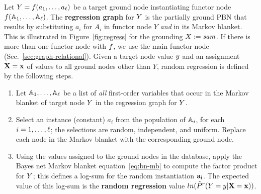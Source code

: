 \documentclass[twoside,leqno,twocolumn]{article}
\begin{document}
Let $Y = f(a_{1},\ldots,a_{\ell})$ be a target ground node instantiating functor node $f(\mathbb{A}_{1},\ldots,\mathbb{A}_{\ell})$.
The \textbf{regression graph} for $Y$ is the partially ground PBN %
that results by substituting $a_{i}$ for $A_{i}$ in functor node $Y$ {\em and} in its Markov blanket. This is illustrated in Figure~\ref{fig:regress} for the grounding $X:= \it{sam}$. If there is more than one functor node with $f$, we use the main functor node (Sec.~\ref{sec:graph-relational}). 
Given a target node value $y$ and an assignment $\mathbf{X} = \mathbf{x}$ of values to all ground nodes other than $Y$, random regression is defined by the following steps.

\begin{enumerate}
\item Let $\mathbb{A}_{1},\ldots,\mathbb{A}_{\ell}$ be a list of {\em all} first-order variables that occur in the Markov blanket of target node $Y$ in the regression graph for $Y$.
\item Select an instance (constant) $a_{i}$ from the population of $\mathbb{A}_{i}$, for each $i=1,\ldots,\ell$; the selections are random, independent, and uniform. Replace each node in the Markov blanket with the corresponding ground node.
\item Using the values assigned to the ground nodes in the database, apply the Bayes net Markov blanket equation~\eqref{eq:bn-mb} 
to compute the factor product for $Y$; this defines a log-sum for the random instantiation $\mathbf{a_{i}}$. The expected value of this log-sum is the \textbf{random regression} value $ln(\tilde{P}^{r}(Y = y|\mathbf{X}=\mathbf{x}))$. 
\end{enumerate}
\end{document}

